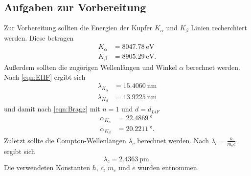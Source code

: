 \subsection{Aufgaben zur Vorbereitung}
Zur Vorbereitung sollten die Energien der Kupfer $K_\alpha$ und $K_\beta$ Linien recherchiert werden.\cite{Copper}
Diese betragen
\begin{align*}
    K_\alpha &= \SI{8047,78}{\electronvolt}\\
    K_\beta &= \SI{8905,29}{\electronvolt}. 
\end{align*}
Außerdem sollten die zugörigen Wellenlängen und Winkel $\alpha$ berechnet werden.
Nach \eqref{eqn:EHF} ergibt sich
\begin{align*}
    \lambda_{K_\alpha} &= \SI{15,4060}{\nano\meter}\\
    \lambda_{K_\beta} &= \SI{13,9225}{\nano\meter}
\end{align*}
und damit nach \eqref{eqn:Bragg} mit $n=1$ und $d = d_{LiF}$
\begin{align*}
    \alpha_{K_\alpha} &= \SI{22,4869}{\degree}\\
    \alpha_{K_\beta} &= \SI{20,2211}{\degree} .
\end{align*}
Zuletzt sollte die Compton-Wellenlängen $\lambda_c$ berechnet werden. Nach $\lambda_c = \frac{h}{m_ec}$ ergibt sich
\begin{equation*}
    \lambda_c = \SI{2,4363}{\pico\meter}.
\end{equation*}
Die verwendeten Konstanten $h$, $c$, $m_e$ und $e$ wurden \cite{Gerth} entnommen.